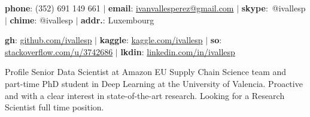 \documentclass{resume} %
\begin{document}
  

\vspace{-10pt}


\begin{flushleft}
	        {\textbf{phone}: (352) 691 149 661 $|$
        \textbf{email}: \href{mailto:ivanvallesperez@gmail.com}{ivanvallesperez@gmail.com} $|$
         \textbf{skype}:\ @ivallesp $|$
         \textbf{chime}: @ivallesp $|$
         \textbf{addr.}: Luxembourg 
         }
\end{flushleft}


\vspace{-6pt}


\begin{flushleft}
	        \textbf{gh}: \href{https://www.github.com/ivallesp}{github.com/ivallesp}  $|$  
        \textbf{kaggle}: \href{https://www.kaggle.com/ivallesp}{kaggle.com/ivallesp}  $|$
        \textbf{so}: \href{https://stackoverflow.com/users/3742686/ivallesp}{stackoverflow.com/u/3742686} $|$
        \textbf{lkdin}: \href{https://www.linkedin.com/in/ivallesp}{linkedin.com/in/ivallesp}

\end{flushleft}


  
      

\begin{rSection}{Profile}
Senior Data Scientist at Amazon EU Supply Chain Science team and part-time PhD student in Deep Learning at the University of Valencia. Proactive and with a clear interest in state-of-the-art research. Looking for a Research Scientist full time position.
\end{rSection}


\end{document}
